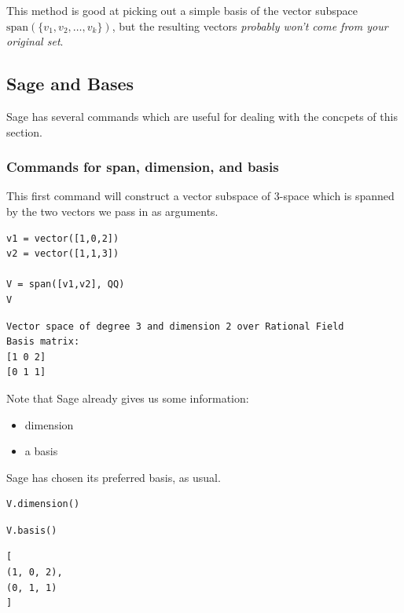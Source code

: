 \documentclass[10pt,]{book}
\theoremstyle{plain}
\theoremstyle{definition}
\numberwithin{equation}{section}
\begin{document}
        \par

          This method is good at picking out a simple basis of the vector
          subspace \(\mathrm{span}(\{v_1, v_2, \ldots, v_k\})\), but the
          resulting vectors \emph{probably won't come from your original set}.

      \typeout{************************************************}
\typeout{************************************************}
\subsection[Sage and Bases]{Sage and Bases}\label{subsection-83}

      Sage has several commands which are useful for dealing with the concpets
      of this section.
\typeout{************************************************}
\typeout{************************************************}
\subsubsection[Commands for span, dimension, and basis]{Commands for span, dimension, and basis}\label{subsubsection-41}

        This first command will
        construct a vector subspace of \(3\)-space which is spanned by the two
        vectors we pass in as arguments.
\begin{lstlisting}[style=sageinput]
v1 = vector([1,0,2])
v2 = vector([1,1,3])

V = span([v1,v2], QQ)
V
\end{lstlisting}
\begin{lstlisting}[style=sageoutput]
Vector space of degree 3 and dimension 2 over Rational Field
Basis matrix:
[1 0 2]
[0 1 1]
\end{lstlisting}
\par

        Note that Sage already gives us some information:
        \begin{itemize}
\item{}dimension\item{}a basis\end{itemize}

        Sage has chosen its preferred basis, as usual.
\begin{lstlisting}[style=sageinput]
V.dimension()
\end{lstlisting}
\begin{lstlisting}[style=sageinput]
V.basis()
\end{lstlisting}
\begin{lstlisting}[style=sageoutput]
[
(1, 0, 2),
(0, 1, 1)
]
\end{lstlisting}
\typeout{************************************************}
\typeout{************************************************}
\end{document}
